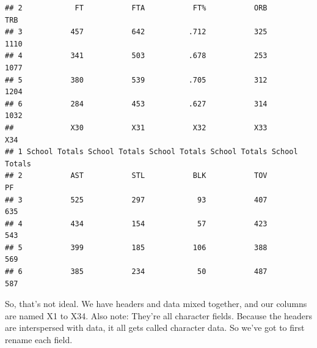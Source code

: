 \documentclass[]{book}
\newenvironment{Shaded}{\begin{snugshade}}{\end{snugshade}}
\newcommand{\DataTypeTok}[1]{\textcolor[rgb]{0.13,0.29,0.53}{#1}}
\newcommand{\KeywordTok}[1]{\textcolor[rgb]{0.13,0.29,0.53}{\textbf{#1}}}
\newcommand{\NormalTok}[1]{#1}
\newcommand{\OperatorTok}[1]{\textcolor[rgb]{0.81,0.36,0.00}{\textbf{#1}}}
\newcommand{\StringTok}[1]{\textcolor[rgb]{0.31,0.60,0.02}{#1}}
\begin{document}
\begin{verbatim}
## 2            FT           FTA           FT%           ORB           TRB
## 3           457           642          .712           325          1110
## 4           341           503          .678           253          1077
## 5           380           539          .705           312          1204
## 6           284           453          .627           314          1032
##             X30           X31           X32           X33           X34
## 1 School Totals School Totals School Totals School Totals School Totals
## 2           AST           STL           BLK           TOV            PF
## 3           525           297            93           407           635
## 4           434           154            57           423           543
## 5           399           185           106           388           569
## 6           385           234            50           487           587
\end{verbatim}

So, that's not ideal. We have headers and data mixed together, and our columns are named X1 to X34. Also note: They're all character fields. Because the headers are interspersed with data, it all gets called character data. So we've got to first rename each field.

\begin{Shaded}
\end{Shaded}
\end{document}
